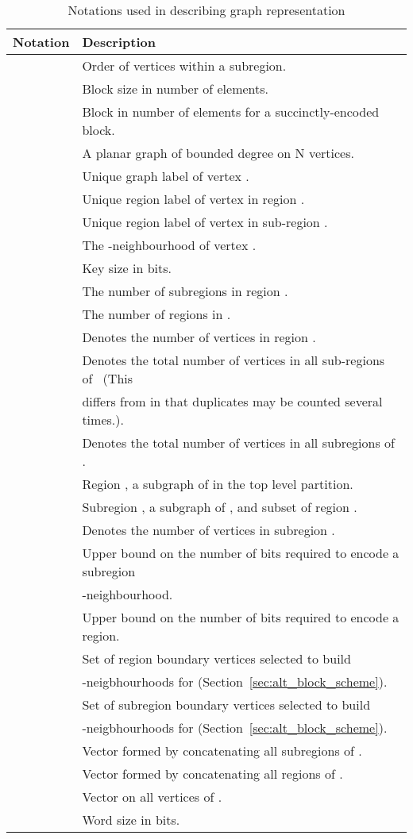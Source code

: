 \begin{table}[H]
	\centering
		\begin{tabular}{ l | l}
			Notation & Description \\ \hline
			 & Order of vertices within a subregion. \\
			 & Block size in number of elements. \\
			 & Block in number of elements for a succinctly-encoded block. \\
			 & A planar graph of bounded degree on N vertices. \\
			 & Unique graph label of vertex .\\
			 & Unique region label of vertex  in region . \\
			 & Unique region label of vertex  in sub-region . \\
			 & The -neighbourhood of vertex . \\
			 & Key size in bits. \\
			 & The number of subregions in region . \\
			 & The number of regions in . \\
			 & Denotes the number of vertices in region . \\
			 & Denotes the total number of vertices in all sub-regions of~ (This \\
			  & differs from  in that duplicates may be counted several times.).\\
			 & Denotes the total number of vertices in all subregions of .\\
			 & Region , a subgraph of  in the top level partition. \\
			 & Subregion , a subgraph of , and subset of region . \\
			 & Denotes the number of vertices in subregion . \\
			 & Upper bound on the number of bits required to encode a subregion \\
			& -neighbourhood. \\
			 & Upper bound on the number of bits required to encode a region. \\		
			 & Set of region boundary vertices selected to build \\
			& -neigbhourhoods for (Section~\ref{sec:alt_block_scheme}). \\
			 & Set of subregion boundary vertices selected to build \\
			& -neigbhourhoods for (Section~\ref{sec:alt_block_scheme}). \\ 
			 & Vector formed by concatenating all subregions of .\\
			 & Vector formed by concatenating all regions of .\\ 
			 & Vector on all vertices of .\\
			 & Word size in bits. \\ \hline
		\end{tabular}
	\caption{Notations used in describing graph representation}
	\label{tab:notation}
\end{table}

